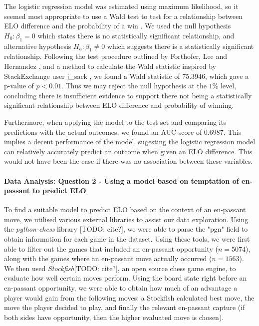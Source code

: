 \documentclass[10pt,a4paper,twocolumn]{article}
\begin{document}
The logistic regression model was estimated using maximum likelihood, so it seemed most appropriate to use a Wald test to test for a relationship between ELO difference and the probability of a win \cite{WaldTest}. We used the null hypothesis $H_{0}: \beta_{1} = 0$ which states there is no statistically significant relationship, and alternative hypothesis $H_{a}: \beta_{1} \neq 0$ which suggests there is a statistically significant relationship. Following the test procedure outlined by Forthofer, Lee and Hernandez \cite{WaldTest}, and a method to calculate the Wald statistic inspired by StackExchange user j\_sack \cite{StackExchangeWaldTest}, we found a Wald statistic of $75.3946$, which gave a p-value of $p<0.01$. Thus we may reject the null hypothesis at the $1\%$ level, concluding there is insufficient evidence to support there not being a statistically significant relationship between ELO difference and probability of winning. \newline

Furthermore, when applying the model to the test set and comparing its predictions with the actual outcomes, we found an AUC score of $0.6987$. This implies a decent performance of the model, sugesting the logistic regression model can relatively accurately predict an outcome when given an ELO difference. This would not have been the case if there was no association between these variables. \newline




\paragraph{Data Analysis: Question 2 - Using a model based on temptation of en-passant to predict ELO}
To find a suitable model to predict ELO based on the context of an en-passant move, we utilised various external libraries to assist our data exploration. Using the \textit{python-chess} library [TODO: cite?], we were able to parse the "pgn" field to obtain information for each game in the dataset. Using these tools, we were first able to filter out the games that included an en-passant opportunity ($n=5074$), along with the games where an en-passant move actually occurred ($n=1563$). We then used \textit{Stockfish}[TODO: cite?], an open source chess game engine, to evaluate how well certain moves perform. Using the board state right before an en-passant opportunity, we were able to obtain how much of an advantage a player would gain from the following moves: a Stockfish calculated best move, the move the player decided to play, and finally the relevant en-passant capture (if both sides have opportunity, then the higher evaluated move is chosen).\newline
\end{document}
